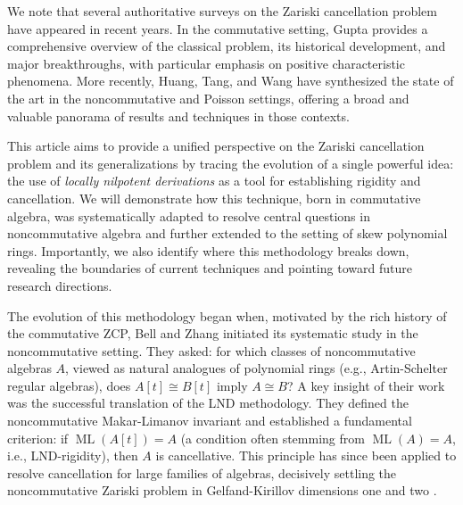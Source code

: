 \documentclass{amsart}
\theoremstyle{plain}
\numberwithin{theorem}{section}
\numberwithin{equation}{theorem}
\theoremstyle{definition}
\DeclareMathOperator{\ML}{ML}
\begin{document}
We note that several authoritative surveys on the Zariski cancellation problem
have appeared in recent years. In the commutative setting, Gupta
\cite{Gu3} provides a comprehensive overview of the classical problem,
its historical development, and major breakthroughs, with particular emphasis
on positive characteristic phenomena. More recently, Huang, Tang, and Wang
\cite{HTW} have synthesized the state of the art in the noncommutative and
Poisson settings, offering a broad and valuable panorama of results and
techniques in those contexts.


This article aims to provide a unified perspective on the Zariski cancellation 
problem and its generalizations by tracing the evolution of a single powerful 
idea: the use of \emph{locally nilpotent derivations} as a tool for establishing 
rigidity and cancellation. We will demonstrate how this technique, born in 
commutative algebra, was systematically adapted to resolve central questions in 
noncommutative algebra and further extended to the setting of skew polynomial 
rings. Importantly, we also identify where this methodology breaks down, revealing 
the boundaries of current techniques and pointing toward future research directions.





The evolution of this methodology began when, motivated by the rich history of the commutative ZCP, Bell and Zhang 
\cite{BellZhang2017} initiated its systematic study in the noncommutative setting. 
They asked: for which classes of noncommutative algebras $A$, viewed as natural 
analogues of polynomial rings (e.g., Artin-Schelter regular algebras), does 
$A[t] \cong B[t]$ imply $A \cong B$? A key insight of their work was the 
successful translation of the LND methodology. They defined the noncommutative 
Makar-Limanov invariant and established a fundamental criterion: if 
$\ML(A[t]) = A$ (a condition often stemming from 
$\ML(A)=A$, i.e., LND-rigidity), then $A$ is cancellative. This 
principle has since been applied to resolve cancellation for large families of 
algebras, decisively settling the noncommutative Zariski problem in 
Gelfand-Kirillov dimensions one and two \cite{BellZhang2017, BHHV, TVZ}.
\end{document}
